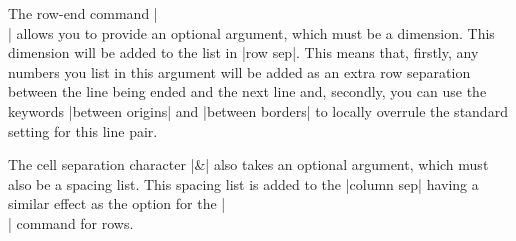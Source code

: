 The row-end command |\\| allows you to provide an optional
argument, which must be a dimension. This dimension will be added to
the list in |row sep|. This means that, firstly, any numbers you list
in this argument will be added as an extra row separation between the
line being ended and the next line and, secondly, you can use the
keywords |between origins| and |between borders| to locally overrule
the standard setting for this line pair.
\begin{codeexample}[]
\end{codeexample}

The cell separation character |&| also takes an optional
argument, which must also be a spacing list. This spacing list is
added to the |column sep| having a similar effect as the option for
the |\\| command for rows.

